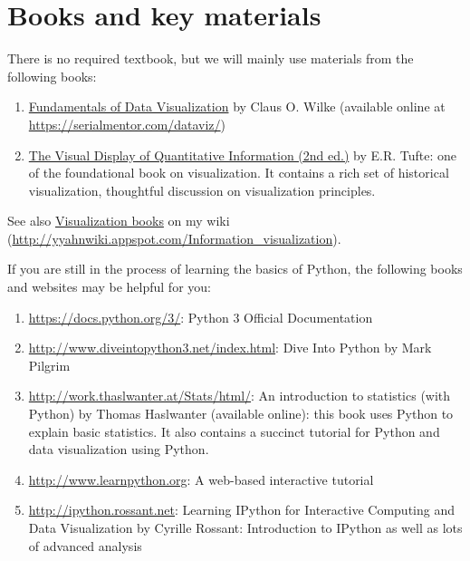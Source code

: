 \documentclass[11pt,article,oneside]{memoir} %
\begin{document}
\section{Books and key materials}%

There is no required textbook, but we will mainly use materials from the following books:

\begin{enumerate}
    
\item \href{https://serialmentor.com/dataviz/}{Fundamentals of Data Visualization} by Claus O. Wilke (available online at \url{https://serialmentor.com/dataviz/})

\item \href{http://www.amazon.com/gp/product/0961392142}{The Visual Display of Quantitative Information (2nd ed.)} by E.R. Tufte: one of the foundational book on visualization. It contains a rich set of historical visualization, thoughtful discussion on visualization principles. 

\end{enumerate}

See also \href{http://yyahnwiki.appspot.com/Information_visualization#h_6225eb5bf8a031f750a1b03f810ccc6a}{Visualization books} on my wiki (\url{http://yyahnwiki.appspot.com/Information_visualization}). 


If you are still in the process of learning the basics of Python, the following books and websites may be helpful for you:


\begin{enumerate}%

\item \url{https://docs.python.org/3/}: Python 3 Official Documentation

\item \url{http://www.diveintopython3.net/index.html}: Dive Into Python by Mark Pilgrim 

\item \url{http://work.thaslwanter.at/Stats/html/}: An introduction to statistics (with Python) by Thomas Haslwanter (available online): this book uses Python to explain basic statistics. It also contains a succinct tutorial for Python and data visualization using Python. 

\item \url{http://www.learnpython.org}: A web-based interactive tutorial 

\item \url{http://ipython.rossant.net}: Learning IPython for Interactive Computing and Data Visualization by Cyrille Rossant: Introduction to IPython as well as lots of advanced analysis 

\end{enumerate}%
\end{document}
